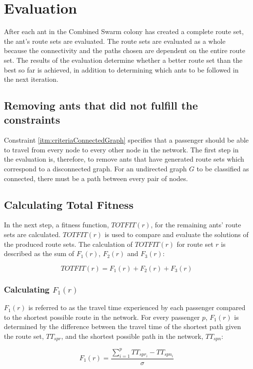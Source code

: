 \section{Evaluation}
\label{sec:algoEvaluation}
After each ant in the Combined Swarm colony has created a complete route set, the ant's route sets are evaluated. The route sets are evaluated as a whole because the connectivity and the paths chosen are dependent on the entire route set. The results of the evaluation determine whether a better route set than the best so far is achieved, in addition to determining which ants to be followed in the next iteration. 

\subsection{Removing ants that did not fulfill the constraints}
\label{sec:algoRemoval}
Constraint \vref{itm:criteriaConnectedGraph} specifies that a passenger should be able to travel from every node to every other node in the network. The first step in the evaluation is, therefore, to remove ants that have generated route sets which correspond to a disconnected graph. For an undirected graph $G$ to be classified as connected, there must be a path between every pair of nodes. 

\subsection{Calculating Total Fitness}
\label{sec:totfit}
In the next step, a fitness function, $TOTFIT(r)$, for the remaining ants' route sets are calculated. $TOTFIT(r)$ is used to compare and evaluate the solutions of the produced route sets. The calculation of $TOTFIT(r)$ for route set $r$ is described as the sum of $F_{1}(r)$, $F_{2}(r)$ and $F_{3}(r)$: 

$$ TOTFIT(r) = F_{1}(r) + F_{2}(r) + F_{3}(r)$$

\subsubsection{Calculating $F_{1}(r)$}
\label{sec:f1}
$F_{1}(r)$ is referred to as the travel time experienced by each passenger compared to the shortest possible route in the network. For every passenger $p$, $F_{1}(r)$ is determined by the difference between the travel time of the shortest path given the route set, $TT_{spr}$, and the shortest possible path in the network, $TT_{spn}$:

$$F_{1}(r) = \frac{\sum\limits^{p}_{i=1}TT_{spr_i}-TT_{spn_i}}{\sigma}$$

